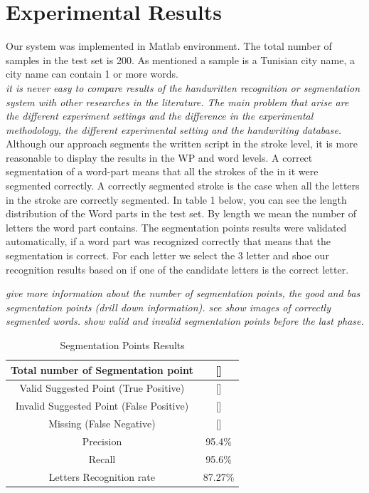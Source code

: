 \documentclass[journal,compsoc]{IEEEtran}
\begin{document}
\section{Experimental Results}
\label{sec:results}
Our system was implemented in Matlab environment. The total number of samples in the test set is 200. As mentioned a sample is a Tunisian city name, a city name can contain 1 or more words. \\
\emph{it is never easy to compare results of the handwritten recognition or segmentation system with other researches in the literature. The main problem that arise are the different experiment settings and the difference in the experimental methodology, the different experimental setting and the handwriting database.}
Although our approach segments the written script in the stroke level, it is more reasonable to display the results in the WP and word levels. A correct segmentation of a word-part means that all the strokes of the in it were segmented correctly. A correctly segmented stroke is the case when all the letters in the stroke are correctly segmented.  In table 1 below, you can see the length distribution of the Word parts in the test set. By length we mean the number of letters the word part contains.
The segmentation points results were validated automatically, if a word part was recognized correctly that means that the segmentation is correct. For each letter we select the 3 letter and shoe our recognition results based on if one of the candidate letters is the correct letter.

\emph{give more information about the number of segmentation points, the good and bas segmentation points (drill down information). see \cite{al2010development}}
\emph{show images of correctly segmented words.}
\emph{show valid and invalid segmentation points before the last phase.}


\begin{table}[h]
\caption{Segmentation Points Results}
\begin{tabular}{ | c | c | }
  \hline
  Total number of Segmentation point & [] \\
  \hline
  Valid Suggested Point (True Positive) & [] \\
  \hline
  Invalid Suggested Point (False Positive) & []\\
  \hline
  Missing (False Negative) & [] \\
  \hline                                    
   Precision & 95.4\% \\ 
 \hline
  Recall &  95.6\% \\ 
 \hline
  Letters Recognition rate & 87.27\% \\
\hline
\end{tabular}
\centering
\label{table:sp_results} 
\end{table}
\end{document}

